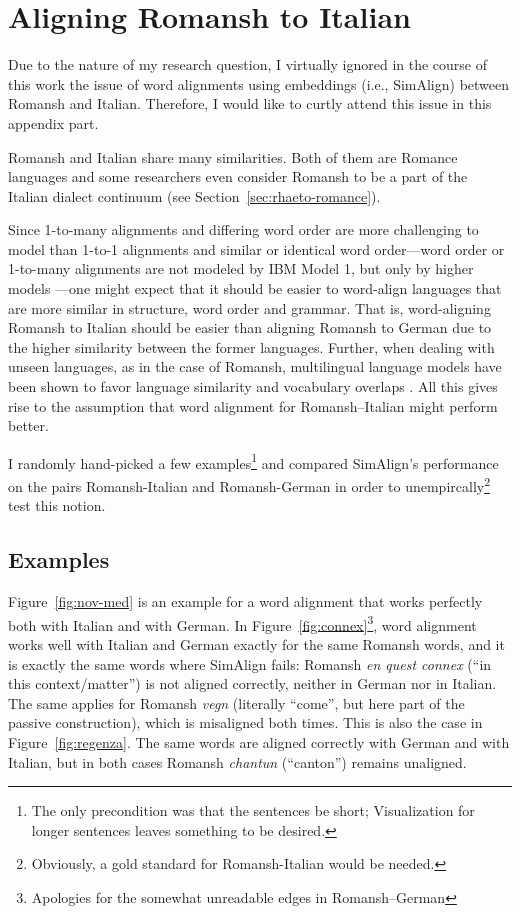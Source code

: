 \chapter{Aligning Romansh to Italian}\label{app:rm-it}

Due to the nature of my research question, I virtually ignored in the course of this work the issue of word alignments using embeddings (i.e., SimAlign) between Romansh and Italian. 
Therefore, I would like to curtly attend this issue in this appendix part.

Romansh and Italian share many similarities. 
Both of them are Romance languages and some researchers even consider Romansh to be a part of the Italian dialect continuum (see Section~\ref{sec:rhaeto-romance}). 

Since 1-to-many alignments and differing word order are more challenging to model than 1-to-1 alignments and similar or identical word order---word order or 1-to-many alignments are not modeled by IBM Model 1, but only by higher models \autocite{brown-etal-1993-mathematics}---one might expect that it should be easier to word-align languages that are more similar in structure, word order and grammar. 
That is, word-aligning Romansh to Italian should be easier than aligning Romansh to German due to the higher similarity between the former languages.
Further, when dealing with unseen languages, as in the case of Romansh, multilingual language models have been shown to favor language similarity and vocabulary overlaps \autocite{pires-etal-2019-multilingual}. 
All this gives rise to the assumption that word alignment for Romansh--Italian might perform better.

I randomly hand-picked a few examples\footnote{The only precondition was that the sentences be short; Visualization for longer sentences leaves something to be desired.} and compared SimAlign's performance on the pairs Romansh-Italian and Romansh-German in order to unempircally\footnote{Obviously, a gold standard for Romansh-Italian would be needed.} test this notion.

\section{Examples}
Figure~\ref{fig:nov-med} is an example for a word alignment that works perfectly both with Italian and with German. 
In Figure~\ref{fig:connex}\footnote{Apologies for the somewhat unreadable edges in Romansh--German}, word alignment works well with Italian and German exactly for the same Romansh words, and it is exactly the same words where SimAlign fails: 
Romansh \emph{en quest connex} (\enquote{in this context/matter}) is not aligned correctly, neither in German nor in Italian. 
The same applies for Romansh \emph{vegn} (literally \enquote{come}, but here part of the passive construction), which is misaligned both times.
This is also the case in Figure~\ref{fig:regenza}. 
The same words are aligned correctly with German and with Italian, 
but in both cases Romansh \emph{chantun} (\enquote{canton}) remains unaligned.


